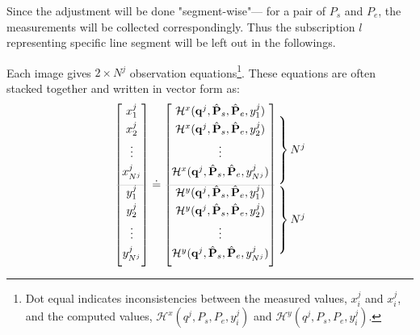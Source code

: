 Since the adjustment will be done "segment-wise"--- for a pair of $P_s$ and $P_e$, the measurements will be collected correspondingly. %
Thus the subscription $l$ representing specific line segment will be left out in the followings.

\clearpage
Each image gives $2\times N^j$ observation equations\footnote{Dot equal indicates inconsistencies between the measured values, $x^j_i$ and $x^j_i$, and the computed values, $\mathcal{H}^x(q^j,P_s,P_e,y^j_i)$ and $\mathcal{H}^y(q^j,P_s,P_e,y^j_i)$.}. These equations are often stacked together and written in vector form as:
\begin{equation} \label{eq:Ffunction}
\begin{bmatrix}
 x^j_1\\[0.3em]
 x^j_2\\[0.3em]
 \vdots\\[0.3em]
 x^j_{N^j}\\[0.5em]
 \arrayrulecolor{lightgray} \hline
 y^j_1\\[0.3em]
 y^j_2\\[0.3em]
 \vdots\\[0.3em]
 y^j_{N^j}\\[0.5em]
\end{bmatrix}
\doteq
\begin{bmatrix}
 \mathcal{H}^x(\mathbf{q}^j,\hat{\mathbf{P}}_s,\hat{\mathbf{P}}_e,y^j_{1})\\[0.3em]
 \mathcal{H}^x(\mathbf{q}^j,\hat{\mathbf{P}}_s,\hat{\mathbf{P}}_e,y^j_{2})\\[0.3em]
 \vdots\\[0.3em]
 \mathcal{H}^x(\mathbf{q}^j,\hat{\mathbf{P}}_s,\hat{\mathbf{P}}_e,y^j_{N^j})\\[0.5em]
 \arrayrulecolor{lightgray} \hline
 \mathcal{H}^y(\mathbf{q}^j,\hat{\mathbf{P}}_s,\hat{\mathbf{P}}_e,y^j_{1})\\[0.3em]
 \mathcal{H}^y(\mathbf{q}^j,\hat{\mathbf{P}}_s,\hat{\mathbf{P}}_e,y^j_{2})\\[0.3em]
 \vdots\\[0.3em]
 \mathcal{H}^y(\mathbf{q}^j,\hat{\mathbf{P}}_s,\hat{\mathbf{P}}_e,y^j_{N^j})\\[0.5em]
\end{bmatrix}
\begin{array}{@{\kern-\nulldelimiterspace}l@{}}
 \left.\begin{array}{@{}c@{}}\\[0.3em] \\[0.3em] \\[0.3em] \\[0.5em] \end{array}\right\} N^j\\
 \left.\begin{array}{@{}c@{}}\\[0.3em] \\[0.3em] \\[0.3em] \\[0.5em] \end{array}\right\} N^j\\
\end{array}
\end{equation}

